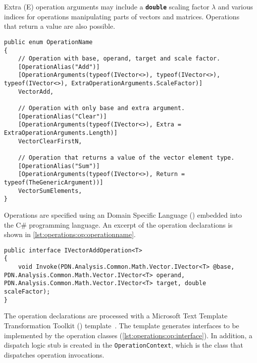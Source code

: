 Extra (E) operation arguments may include a \texttt{\textbf{double}}
scaling factor $\lambda$ and various indices for operations
manipulating parts of vectors and matrices. Operations that return a
value are also possible.

\begin{lstlisting}[float,caption={\textls{DSL} for operation
    declarations (excerpt).},label=lst:operations:op:operationname]
public enum OperationName
{
    // Operation with base, operand, target and scale factor.
    [OperationAlias("Add")]
    [OperationArguments(typeof(IVector<>), typeof(IVector<>), typeof(IVector<>), ExtraOperationArguments.ScaleFactor)]
    VectorAdd,

    // Operation with only base and extra argument.
    [OperationAlias("Clear")]
    [OperationArguments(typeof(IVector<>), Extra = ExtraOperationArguments.Length)]
    VectorClearFirstN,

    // Operation that returns a value of the vector element type.
    [OperationAlias("Sum")]
    [OperationArguments(typeof(IVector<>), Return = typeof(TheGenericArgument))]
    VectorSumElements,
}
\end{lstlisting}

Operations are specified using an Domain Specific Language
() embedded into the C\# programming language. An excerpt
of the operation declarations is shown in
\cref{lst:operations:op:operationname}.

\begin{lstlisting}[float,caption={An example interface generated by
    the \texttt{T4} template.},label=lst:operations:op:interface]
public interface IVectorAddOperation<T>
{
    void Invoke(PDN.Analysis.Common.Math.Vector.IVector<T> @base, PDN.Analysis.Common.Math.Vector.IVector<T> operand, PDN.Analysis.Common.Math.Vector.IVector<T> target, double scaleFactor);
}
\end{lstlisting}

The operation declarations are processed with a Microsoft Text
Template Transformation Toolkit () template~\citep{T4}. The
template generates interfaces to be implemented by the operation
classes (\cref{lst:operations:op:interface}). In addition, a dispatch
logic stub is created in the \texttt{OperationContext}, which is the
class that dispatches operation invocations.

